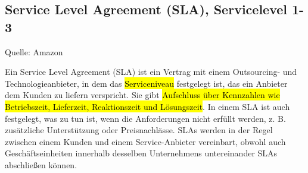 \subsection{Service Level Agreement (SLA), Servicelevel 1-3}
\label{sec:ServiceLevelAgreement}

Quelle: Amazon \cite{SLAAmazon}

Ein Service Level Agreement (SLA) ist ein Vertrag mit einem Outsourcing- und Technologieanbieter, in dem das \hl{Serviceniveau} festgelegt ist, das ein Anbieter dem Kunden zu liefern verspricht. Sie gibt \hl{Aufschluss über Kennzahlen wie Betriebszeit, Lieferzeit, Reaktionszeit und Lösungszeit}. In einem SLA ist auch festgelegt, was zu tun ist, wenn die Anforderungen nicht erfüllt werden, z. B. zusätzliche Unterstützung oder Preisnachlässe. SLAs werden in der Regel zwischen einem Kunden und einem Service-Anbieter vereinbart, obwohl auch Geschäftseinheiten innerhalb desselben Unternehmens untereinander SLAs abschließen können.





